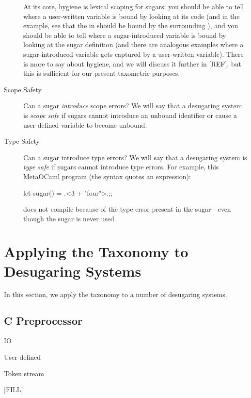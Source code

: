 \begin{description}
    At its core, hygiene is lexical scoping for sugars: you should be
    able to tell where a user-written variable is bound by looking at
    its code (and in the example, see that the  in  should be bound by the surrounding ), and
    you should be able to tell where a sugar-introduced variable is
    bound by looking at the sugar definition (and there are analogous
    examples where a sugar-introduced variable gets captured by a
    user-written variable). There is more to say about hygiene, and we
    will discuss it further in [REF], but this is sufficient for our
    present taxometric purposes. %
    
  \item[Scope Safety] Can a sugar \emph{introduce} scope errors?  We
    will say that a desugaring system is \emph{scope safe} if sugars
    cannot introduce an unbound identifier or cause a user-defined
    variable to become unbound.

  \item[Type Safety] Can a sugar introduce type errors? We will say
    that a desugaring system is \emph{type safe} if sugars cannot
    introduce type errors. For example, this MetaOCaml program (the
     syntax quotes an expression):
\begin{CorrectlyIndentedCodes}
let sugar() = .<3 + "four">.;;
\end{CorrectlyIndentedCodes}
    does not compile because of the type error present in the
    sugar---even though the sugar is never used.
\end{description}

\section{Applying the Taxonomy to Desugaring Systems}

In this section, we apply the taxonomy to a number of desugaring systems.

\subsection{C Preprocessor} \label{sec:cpre}

 IO

 User-defined

 Token stream

 [FILL]

